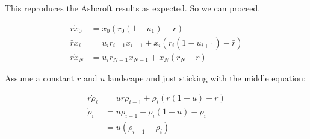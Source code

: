 \documentclass[a4paper]{article}
\begin{document}
This reproduces the Ashcroft results as expected. So we can proceed. 

\begin{align}
\bar{r} \dot{x} _0 & = x_0 \left( r_0  \left( 1- u_{1} \right) - \bar{r} \right) \\
\bar{r} \dot{x} _i & = u_i r_{i-1} x_{i-1} + x_i \left( r_i  \left( 1- u_{i+1} \right) - \bar{r} \right) \\
\bar{r} \dot{x} _N & = u_i r_{N-1} x_{N-1} + x_N \left( r_N   - \bar{r} \right)
\end{align}

Assume a constant $r$ and $u$ landscape and just sticking with the middle equation:

\begin{align*}
r \dot{\rho} _i & = u r \rho _{i-1} + \rho _i ( r(1- u) - r) \\
\dot{\rho} _i & = u \rho _{i-1} + \rho _i ( 1-u) - \rho _{i} \\
& = u  ( \rho _{i-1} -  \rho _{i} ) \\
\end{align*}
\end{document}
